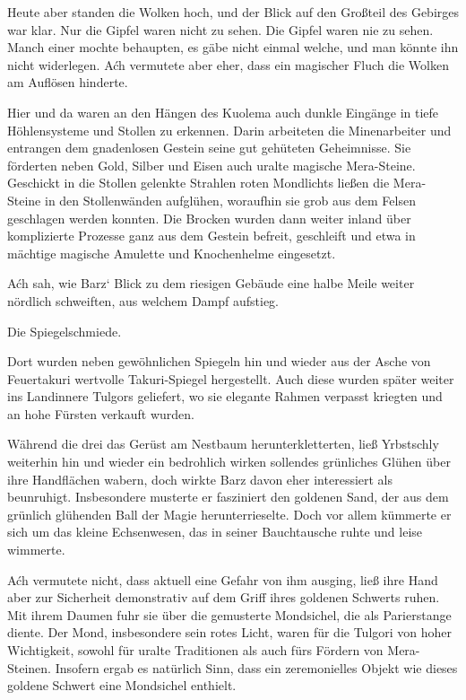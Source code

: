 Heute aber standen die Wolken hoch, und der Blick auf den Großteil des Gebirges war klar. Nur die Gipfel waren nicht zu sehen. Die Gipfel waren nie zu sehen. Manch einer mochte behaupten, es gäbe nicht einmal welche, und man könnte ihn nicht widerlegen. Aćh vermutete aber eher, dass ein magischer Fluch die Wolken am Auflösen hinderte.

Hier und da waren an den Hängen des Kuolema auch dunkle Eingänge in tiefe Höhlensysteme und Stollen zu erkennen. Darin arbeiteten die Minenarbeiter und entrangen dem gnadenlosen Gestein seine gut gehüteten Geheimnisse. Sie förderten neben Gold, Silber und Eisen auch uralte magische Mera-Steine. Geschickt in die Stollen gelenkte Strahlen roten Mondlichts ließen die Mera-Steine in den Stollenwänden aufglühen, woraufhin sie grob aus dem Felsen geschlagen werden konnten. Die Brocken wurden dann weiter inland über komplizierte Prozesse ganz aus dem Gestein befreit, geschleift und etwa in mächtige magische Amulette und Knochenhelme eingesetzt.

Aćh sah, wie Barz‘ Blick zu dem riesigen Gebäude eine halbe Meile weiter nördlich schweiften, aus welchem Dampf aufstieg.

Die Spiegelschmiede.

Dort wurden neben gewöhnlichen Spiegeln hin und wieder aus der Asche von Feuertakuri wertvolle Takuri-Spiegel hergestellt. Auch diese wurden später weiter ins Landinnere Tulgors geliefert, wo sie elegante Rahmen verpasst kriegten und an hohe Fürsten verkauft wurden.

Während die drei das Gerüst am Nestbaum herunterkletterten, ließ Yrbstschly weiterhin hin und wieder ein bedrohlich wirken sollendes grünliches Glühen über ihre Handflächen wabern, doch wirkte Barz davon eher interessiert als beunruhigt. Insbesondere musterte er fasziniert den goldenen Sand, der aus dem grünlich glühenden Ball der Magie herunterrieselte. Doch vor allem kümmerte er sich um das kleine Echsenwesen, das in seiner Bauchtausche ruhte und leise wimmerte.

Aćh vermutete nicht, dass aktuell eine Gefahr von ihm ausging, ließ ihre Hand aber zur Sicherheit demonstrativ auf dem Griff ihres goldenen Schwerts ruhen. Mit ihrem Daumen fuhr sie über die gemusterte Mondsichel, die als Parierstange diente. Der Mond, insbesondere sein rotes Licht, waren für die Tulgori von hoher Wichtigkeit, sowohl für uralte Traditionen als auch fürs Fördern von Mera-Steinen. Insofern ergab es natürlich Sinn, dass ein zeremonielles Objekt wie dieses goldene Schwert eine Mondsichel enthielt.

